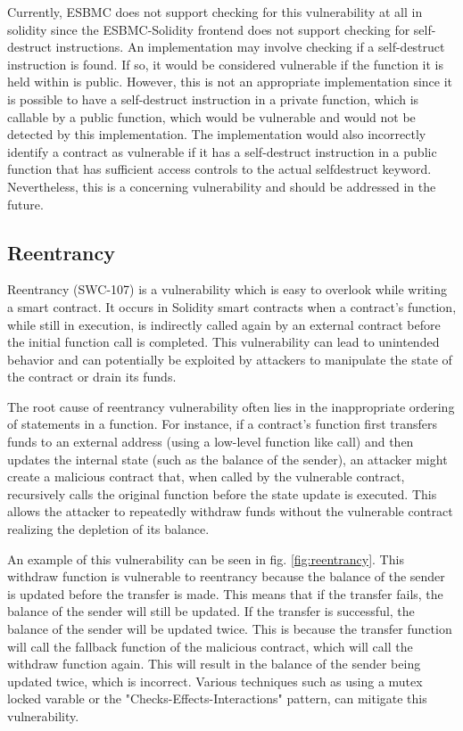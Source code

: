 Currently, ESBMC does not support checking for this vulnerability at all in solidity since the ESBMC-Solidity frontend does not support checking for self-destruct instructions. An implementation may involve checking if a self-destruct instruction is found. If so, it would be considered vulnerable if the function it is held within is public. However, this is not an appropriate implementation since it is possible to have a self-destruct instruction in a private function, which is callable by a public function, which would be vulnerable and would not be detected by this implementation. The implementation would also incorrectly identify a contract as vulnerable if it has a self-destruct instruction in a public function that has sufficient access controls to the actual selfdestruct keyword. Nevertheless, this is a concerning vulnerability and should be addressed in the future.

\subsection{Reentrancy}
\label{sec:reentrancy}

Reentrancy (SWC-107) is a vulnerability which is easy to overlook while writing a smart contract. It occurs in Solidity smart contracts when a contract's function, while still in execution, is indirectly called again by an external contract before the initial function call is completed. This vulnerability can lead to unintended behavior and can potentially be exploited by attackers to manipulate the state of the contract or drain its funds.

The root cause of reentrancy vulnerability often lies in the inappropriate ordering of statements in a function. For instance, if a contract's function first transfers funds to an external address (using a low-level function like call) and then updates the internal state (such as the balance of the sender), an attacker might create a malicious contract that, when called by the vulnerable contract, recursively calls the original function before the state update is executed. This allows the attacker to repeatedly withdraw funds without the vulnerable contract realizing the depletion of its balance.

An example of this vulnerability can be seen in fig. \ref{fig:reentrancy}. This withdraw function is vulnerable to reentrancy because the balance of the sender is updated before the transfer is made. This means that if the transfer fails, the balance of the sender will still be updated. If the transfer is successful, the balance of the sender will be updated twice. This is because the transfer function will call the fallback function of the malicious contract, which will call the withdraw function again. This will result in the balance of the sender being updated twice, which is incorrect. Various techniques such as using a mutex locked varable or the "Checks-Effects-Interactions" pattern, can mitigate this vulnerability.

